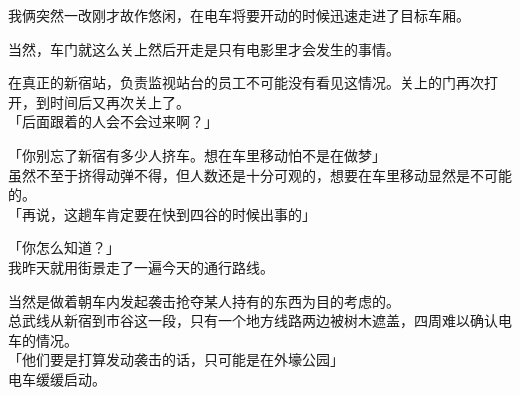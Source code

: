 我俩突然一改刚才故作悠闲，在电车将要开动的时候迅速走进了目标车厢。

当然，车门就这么关上然后开走是只有电影里才会发生的事情。

在真正的新宿站，负责监视站台的员工不可能没有看见这情况。关上的门再次打开，到时间后又再次关上了。\\

 「后面跟着的人会不会过来啊？」

「你别忘了新宿有多少人挤车。想在车里移动怕不是在做梦」\\

虽然不至于挤得动弹不得，但人数还是十分可观的，想要在车里移动显然是不可能的。\\

「再说，这趟车肯定要在快到四谷的时候出事的」

「你怎么知道？」\\

我昨天就用街景走了一遍今天的通行路线。

当然是做着朝车内发起袭击抢夺某人持有的东西为目的考虑的。\\

总武线从新宿到市谷这一段，只有一个地方线路两边被树木遮盖，四周难以确认电车的情况。\\

「他们要是打算发动袭击的话，只可能是在外壕公园」\\

电车缓缓启动。\\

